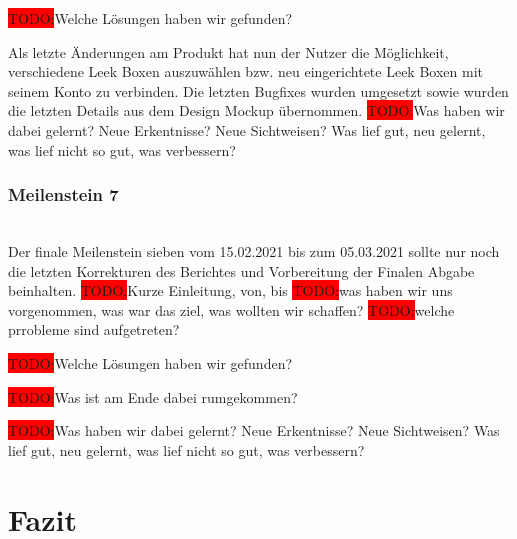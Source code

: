 \documentclass[10pt, a4paper]{article}
\begin{document}
\colorbox{red}{TODO:}Welche Lösungen haben wir gefunden?

Als letzte Änderungen am Produkt hat nun der Nutzer die Möglichkeit, verschiedene Leek Boxen auszuwählen bzw. neu eingerichtete Leek Boxen mit seinem Konto zu verbinden.
Die letzten Bugfixes wurden umgesetzt sowie wurden die letzten Details aus dem Design Mockup übernommen.
\colorbox{red}{TODO:}Was haben wir dabei gelernt? Neue Erkentnisse? Neue Sichtweisen?
Was lief gut, neu gelernt, was lief nicht so gut, was verbessern?

\subsubsection*{Meilenstein 7} $~$ \\
Der finale Meilenstein sieben vom 15.02.2021 bis zum 05.03.2021 sollte nur noch die letzten Korrekturen des Berichtes und Vorbereitung der Finalen Abgabe beinhalten.
\colorbox{red}{TODO:}Kurze Einleitung, von, bis
\colorbox{red}{TODO:}was haben wir uns vorgenommen, was war das ziel, was wollten wir schaffen?
\colorbox{red}{TODO:}welche prrobleme sind aufgetreten?

\colorbox{red}{TODO:}Welche Lösungen haben wir gefunden?

\colorbox{red}{TODO:}Was ist am Ende dabei rumgekommen?

\colorbox{red}{TODO:}Was haben wir dabei gelernt? Neue Erkentnisse? Neue Sichtweisen?
Was lief gut, neu gelernt, was lief nicht so gut, was verbessern?


\section{Fazit}
\end{document}
